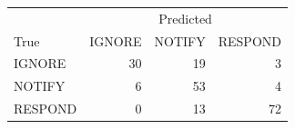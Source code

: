 \begin{tabular}{lrrr}
\toprule
 & \multicolumn{3}{c}{Predicted} \\
True & IGNORE & NOTIFY & RESPOND \\
\midrule
IGNORE & 30 & 19 & 3 \\
NOTIFY & 6 & 53 & 4 \\
RESPOND & 0 & 13 & 72 \\
\bottomrule
\end{tabular}

